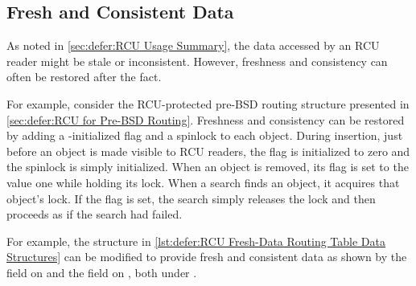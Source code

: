 \FloatBarrier
\subsection{Fresh and Consistent Data}
\label{sec:together:Fresh and Consistent Data}

As noted in
\cref{sec:defer:RCU Usage Summary},
the data accessed by an RCU reader might be stale or inconsistent.
However, freshness and consistency can often be restored after the
fact.

For example, consider the RCU-protected pre-BSD routing structure
presented in
\cref{sec:defer:RCU for Pre-BSD Routing}.
Freshness and consistency can be restored by adding a
-initialized  flag and a spinlock to each object.
During insertion, just before an object is made visible to RCU readers,
the  flag is initialized to zero and the spinlock is simply
initialized.
When an object is removed, its  flag is set to the value
one while holding its lock.
When a search finds an object, it acquires that object's lock.
If the  flag is set, the search simply releases the lock
and then proceeds as if the search had failed.

\begin{listing}

\caption{RCU Fresh-Data Routing Table Data Structures}
\label{lst:defer:RCU Fresh-Data Routing Table Data Structures}
\end{listing}

\begin{fcvref}
For example, the  structure in
\cref{lst:defer:RCU Fresh-Data Routing Table Data Structures}
can be modified to provide fresh and consistent data as shown by the
 field on  and the 
field on , both under .
\end{fcvref}

\begin{listing}

\caption{RCU Fresh-Data Routing Table Lookup}
\label{lst:defer:RCU Fresh-Data Routing Table Lookup}
\end{listing}

